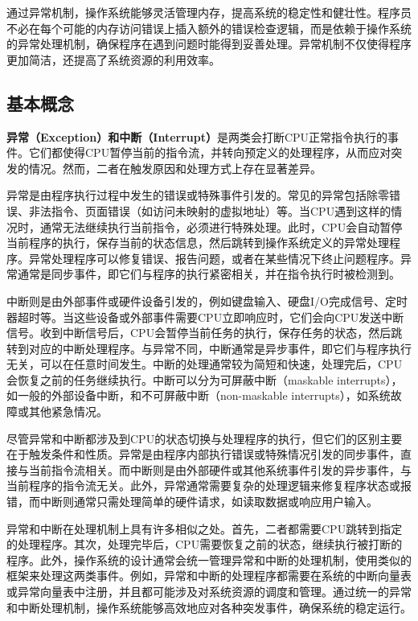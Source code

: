 通过异常机制，操作系统能够灵活管理内存，提高系统的稳定性和健壮性。程序员不必在每个可能的内存访问错误上插入额外的错误检查逻辑，而是依赖于操作系统的异常处理机制，确保程序在遇到问题时能得到妥善处理。异常机制不仅使得程序更加简洁，还提高了系统资源的利用效率。

\subsection{基本概念}\label{sec:07-exceptions-004}

\textbf{异常（Exception）和中断（Interrupt）}是两类会打断CPU正常指令执行的事件。它们都使得CPU暂停当前的指令流，并转向预定义的处理程序，从而应对突发的情况。然而，二者在触发原因和处理方式上存在显著差异。

异常是由程序执行过程中发生的错误或特殊事件引发的。常见的异常包括除零错误、非法指令、页面错误（如访问未映射的虚拟地址）等。当CPU遇到这样的情况时，通常无法继续执行当前指令，必须进行特殊处理。此时，CPU会自动暂停当前程序的执行，保存当前的状态信息，然后跳转到操作系统定义的异常处理程序。异常处理程序可以修复错误、报告问题，或者在某些情况下终止问题程序。异常通常是同步事件，即它们与程序的执行紧密相关，并在指令执行时被检测到。

中断则是由外部事件或硬件设备引发的，例如键盘输入、硬盘I/O完成信号、定时器超时等。当这些设备或外部事件需要CPU立即响应时，它们会向CPU发送中断信号。收到中断信号后，CPU会暂停当前任务的执行，保存任务的状态，然后跳转到对应的中断处理程序。与异常不同，中断通常是异步事件，即它们与程序执行无关，可以在任意时间发生。中断的处理通常较为简短和快速，处理完后，CPU会恢复之前的任务继续执行。中断可以分为可屏蔽中断（maskable interrupts），如一般的外部设备中断，和不可屏蔽中断（non-maskable interrupts），如系统故障或其他紧急情况。

尽管异常和中断都涉及到CPU的状态切换与处理程序的执行，但它们的区别主要在于触发条件和性质。异常是由程序内部执行错误或特殊情况引发的同步事件，直接与当前指令流相关。而中断则是由外部硬件或其他系统事件引发的异步事件，与当前程序的指令流无关。此外，异常通常需要复杂的处理逻辑来修复程序状态或报错，而中断则通常只需处理简单的硬件请求，如读取数据或响应用户输入。

异常和中断在处理机制上具有许多相似之处。首先，二者都需要CPU跳转到指定的处理程序。其次，处理完毕后，CPU需要恢复之前的状态，继续执行被打断的程序。此外，操作系统的设计通常会统一管理异常和中断的处理机制，使用类似的框架来处理这两类事件。例如，异常和中断的处理程序都需要在系统的中断向量表或异常向量表中注册，并且都可能涉及对系统资源的调度和管理。通过统一的异常和中断处理机制，操作系统能够高效地应对各种突发事件，确保系统的稳定运行。

